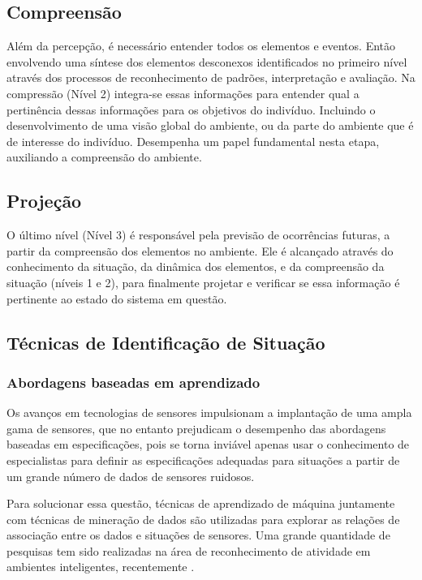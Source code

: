 \documentclass[12pt,a4paper,compsoc]{IEEEtran}
\begin{document}
\subsection{Compreensão}

  Além da percepção, é necessário entender todos os elementos e eventos. Então envolvendo uma 
  síntese dos elementos desconexos identificados no primeiro nível através dos processos de 
  reconhecimento de padrões, interpretação e avaliação. Na compressão (Nível 2) integra-se essas
  informações para entender qual a pertinência dessas informações para os objetivos do indivíduo.
  Incluindo o desenvolvimento de uma visão global do ambiente, ou da parte do ambiente que é de 
  interesse do indivíduo. Desempenha um papel fundamental nesta etapa, auxiliando a compreensão do
  ambiente.


\subsection{Projeção}

  O último nível (Nível 3)  é responsável pela previsão de ocorrências futuras, a partir da 
  compreensão dos elementos no ambiente. Ele é alcançado através do conhecimento da situação, da
  dinâmica dos elementos, e da compreensão da situação (níveis 1 e 2), para finalmente projetar e
  verificar se essa informação é pertinente ao estado do sistema em questão.


\subsection{Técnicas de Identificação de Situação}


\subsubsection{Abordagens baseadas em aprendizado}

  Os avanços em tecnologias de sensores impulsionam a implantação de uma ampla gama de sensores,
  que no entanto prejudicam o desempenho das abordagens baseadas em especificações, pois se torna
  inviável apenas usar o conhecimento de especialistas para definir as especificações adequadas
  para situações a partir de um grande número de dados de sensores ruidosos.
  
  Para solucionar essa questão, técnicas de aprendizado de máquina juntamente com técnicas de
  mineração de dados são utilizadas para explorar as relações de associação entre os dados e 
  situações de sensores. Uma grande quantidade de pesquisas tem sido realizadas na área de
  reconhecimento de atividade em ambientes inteligentes, recentemente \cite{knappmeyer2012survey}.
  
\end{document}
